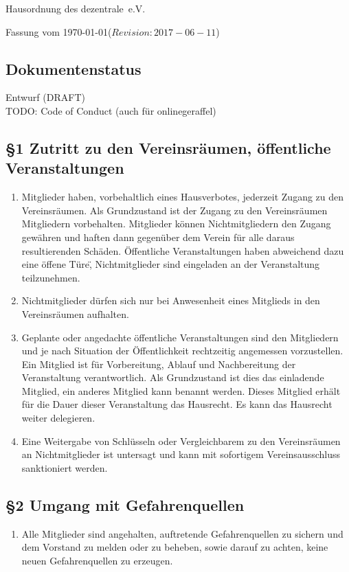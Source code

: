 \documentclass[10pt,a4paper]{article}
\newcommand{\name}{dezentrale}
\newcommand{\revision}{$Revision: 2017-06-11$}
\newcommand{\documentstatus}{Entwurf (DRAFT)}
\begin{document}
{\LARGE Hausordnung des \name\ e.V.}

Fassung vom \today (\revision)

\subsection*{Dokumentenstatus}
\documentstatus
\\
TODO: Code of Conduct (auch f{\"u}r onlinegeraffel)

%
%

\subsection*{\S 1 Zutritt zu den Vereinsr{\"a}umen, {\"o}ffentliche Veranstaltungen}
\begin{enumerate}
\item Mitglieder haben, vorbehaltlich eines Hausverbotes, jederzeit Zugang zu
den Vereinsr{\"a}umen. Als Grundzustand ist der Zugang zu den Vereinsr{\"a}umen
Mitgliedern vorbehalten. Mitglieder k{\"o}nnen Nichtmitgliedern den Zugang
gew{\"a}hren und haften dann gegen{\"u}ber dem Verein f{\"u}r alle daraus resultierenden Sch{\"a}den.
{\"O}ffentliche Veranstaltungen haben abweichend dazu eine \"offene T{\"u}re\",
Nichtmitglieder sind eingeladen an der Veranstaltung teilzunehmen.
\item Nichtmitglieder d{\"u}rfen sich nur bei Anwesenheit eines Mitglieds in den
Vereinsr{\"a}umen aufhalten.
\item Geplante oder angedachte {\"o}ffentliche Veranstaltungen sind den Mitgliedern und je nach Situation der {\"O}ffentlichkeit rechtzeitig angemessen vorzustellen. Ein Mitglied ist f{\"u}r Vorbereitung, Ablauf und Nachbereitung der Veranstaltung verantwortlich. Als Grundzustand ist dies das einladende Mitglied, ein anderes Mitglied kann benannt werden. Dieses Mitglied erh{\"a}lt f{\"u}r die Dauer dieser Veranstaltung das Hausrecht. Es kann das Hausrecht weiter delegieren.
\item Eine Weitergabe von Schl{\"u}sseln oder Vergleichbarem zu den Vereinsr{\"a}umen an Nichtmitglieder ist untersagt und kann mit sofortigem Vereinsausschluss sanktioniert werden.
\end{enumerate}

%
%
\subsection*{\S 2 Umgang mit Gefahrenquellen}
\begin{enumerate}
\item Alle Mitglieder sind angehalten, auftretende Gefahrenquellen zu sichern und dem Vorstand zu melden oder zu beheben, sowie darauf zu achten, keine
    neuen Gefahrenquellen zu erzeugen.
\end{enumerate}
\end{document}
